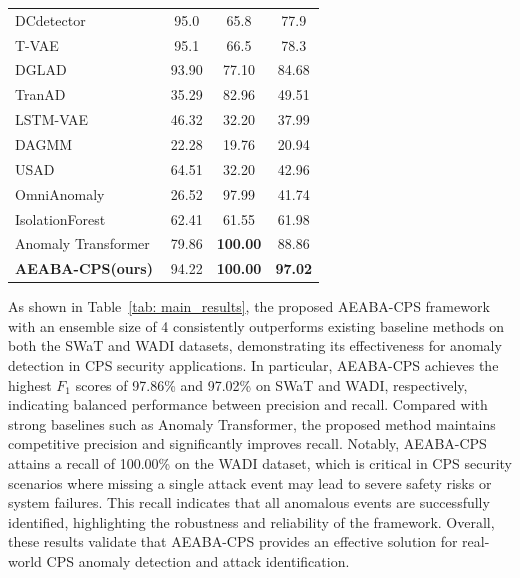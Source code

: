 \documentclass[pdflatex,sn-mathphys-num]{sn-jnl}
\theoremstyle{thmstyleone}
\theoremstyle{thmstyletwo}
\theoremstyle{thmstylethree}
\begin{document}
\begin{table}
\begin{small}
\begin{minipage}[t]{0.45\textwidth}
{\begin{tabular}{l|ccc}
            \midrule
            DCdetector~\cite{li2025t} & 95.0 & 65.8 & 77.9 \\
            T-VAE~\cite{li2025t} & 95.1 & 66.5 & 78.3 \\
            DGLAD~\cite{luo2025dual}  & 93.90 & 77.10 & 84.68\\
            TranAD~\cite{tuli2022tranad}& 35.29 &82.96 &49.51\\
            LSTM-VAE~\cite{audibert2020usad} &46.32 &32.20 &37.99 \\
            DAGMM~\cite{audibert2020usad} &22.28 &19.76 &20.94 \\
            USAD~\cite{audibert2020usad} &64.51 &32.20 &42.96  \\
            OmniAnomaly~\cite{audibert2020usad} &26.52 &97.99 &41.74 \\
            IsolationForest~\cite{audibert2020usad} &62.41 &61.55 &61.98\\
            Anomaly Transformer~\cite{energyefficient2025yang} & 79.86 & \textbf{100.00} & 88.86 \\
            \midrule
            \textbf{AEABA-CPS(ours)} & 94.22  & \textbf{100.00} & \textbf{97.02} \\
            \bottomrule
        \end{tabular}
        }
    \end{minipage}
    \end{small}
\end{table}

As shown in Table~\ref{tab: main_results}, the proposed AEABA-CPS framework with an ensemble size of 4 consistently outperforms existing baseline methods on both the SWaT and WADI datasets, demonstrating its effectiveness for anomaly detection in CPS security applications. In particular, AEABA-CPS achieves the highest $F_1$ scores of 97.86\% and 97.02\% on SWaT and WADI, respectively, indicating balanced performance between precision and recall. Compared with strong baselines such as Anomaly Transformer, the proposed method maintains competitive precision and significantly improves recall. Notably, AEABA-CPS attains a recall of 100.00\% on the WADI dataset, which is critical in CPS security scenarios where missing a single attack event may lead to severe safety risks or system failures. This recall indicates that all anomalous events are successfully identified, highlighting the robustness and reliability of the framework. Overall, these results validate that AEABA-CPS provides an effective solution for real-world CPS anomaly detection and attack identification.
\end{document}
